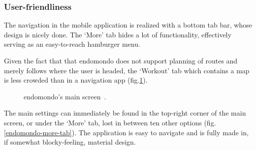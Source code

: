 \subsubsection*{User-friendliness}
The navigation in the mobile application is realized with a bottom tab bar, whose design is nicely done.
The `More' tab hides a lot of functionality, effectively serving as an easy-to-reach hamburger menu.

Given the fact that that endomondo does not support planning of routes and merely follows where the user is headed, the `Workout' tab which contains a map is less crowded than in a navigation app (fig.\ref{endomondo-home-img}).

\begin{figure}[h!]
    \centering
        \caption{endomondo's main screen~\cite{endomondo-home-img}.}
        \label{endomondo-home-img}
\end{figure}

The main settings can immediately be found in the top-right corner of the main screen, or under the `More' tab, lost in between ten other options (fig.\ref{endomondo-more-tab}).
The application is easy to navigate and is fully made in, if somewhat blocky-feeling, material design.


